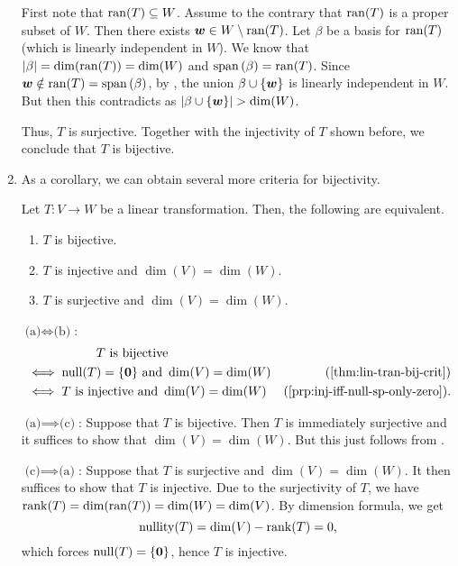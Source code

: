 \begin{enumerate}
\begin{pf}
\begin{pf}
First note that \(\operatorname{ran}(T)\subseteq W\). Assume to the contrary that \(\operatorname{ran}(T)\)
is a proper subset of \(W\). Then there exists \(\vb*{w}\in
W\setminus\operatorname{ran}(T)\).  Let \(\beta\) be a basis for \(\operatorname{ran}(T)\) (which is
linearly independent in \(W\)). We know that \(|\beta|=\dim(\operatorname{ran}(T))=\dim(W)\)
and \(\operatorname{span}\qty(\beta)=\operatorname{ran}(T)\). Since \(\vb*{w}\notin\operatorname{ran}(T)=\operatorname{span}\qty(\beta)\), by
, the union \(\beta\cup\{\vb*{w}\}\) is linearly
independent in \(W\). But then this contradicts  as
\(|\beta\cup\{\vect{w}\}|>\dim(W)\).
\end{pf}

Thus, \(T\) is surjective. Together with the injectivity of \(T\) shown
before, we conclude that \(T\) is bijective.
\end{pf}

\item As a corollary, we can obtain several more criteria for bijectivity.

\begin{corollary}
\label{cor:more-lt-bij-crit}
Let \(T:V\to W\) be a linear transformation. Then, the following are equivalent.
\begin{enumerate}
\item \(T\) is bijective.
\item \(T\) is injective and \(\dim(V)=\dim(W)\).
\item \(T\) is surjective and \(\dim(V)=\dim(W)\).
\end{enumerate}
\end{corollary}
\begin{pf}
\underline{\(\text{(a)}\iff\text{(b)}\)}:
\begin{align*}
&\hspace{2cm}\text{\(T\) is bijective} \\
&\iff\nul{T}=\{\vect{0}\}\text{ and }\dim(V)=\dim(W) &\text{(\Cref{thm:lin-tran-bij-crit})} \\
&\iff T\text{ is injective and }\dim(V)=\dim(W)&\text{(\Cref{prp:inj-iff-null-sp-only-zero})}.
\end{align*}

\underline{\(\text{(a)}\implies\text{(c)}\)}: Suppose that \(T\) is bijective. Then
\(T\) is immediately surjective and it suffices to show that
\(\dim(V)=\dim(W)\). But this just follows from .

\underline{\(\text{(c)}\implies \text{(a)}\)}: Suppose that \(T\) is surjective
and \(\dim(V)=\dim(W)\). It then suffices to show that \(T\) is injective. Due
to the surjectivity of \(T\), we have \(\operatorname{rank}(T)=\dim(\operatorname{ran}(T))=\dim(W)=\dim(V)\).
By dimension formula, we get
\[
\operatorname{nullity}(T)=\dim(V)-\operatorname{rank}(T)=0,
\]
which forces \(\operatorname{null}(T)=\{\vb*{0}\}\), hence \(T\) is injective.
\end{pf}


\end{enumerate}
